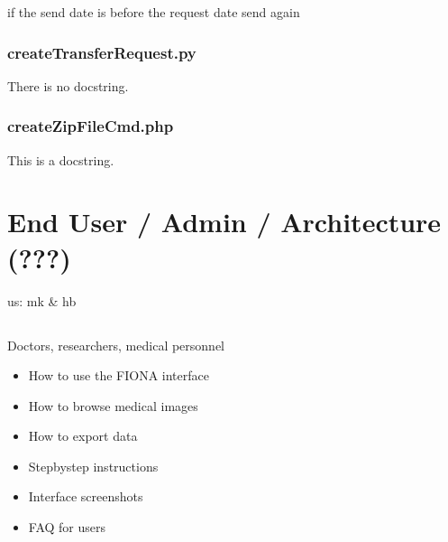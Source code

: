 \documentclass[letterpaper,10pt,english]{sphinxmanual}
\begin{document}
\sphinxAtStartPar
if the send date is before the request date send again

\sphinxstepscope


\subsection{createTransferRequest.py}
\label{\detokenize{Architecture/scripts/createTransferRequest:createtransferrequest-py}}\label{\detokenize{Architecture/scripts/createTransferRequest::doc}}
\sphinxAtStartPar
There is no docstring.

\sphinxstepscope


\subsection{createZipFileCmd.php}
\label{\detokenize{Architecture/scripts/createZipFileCmd:createzipfilecmd-php}}\label{\detokenize{Architecture/scripts/createZipFileCmd::doc}}
\sphinxAtStartPar
This is a docstring.

\sphinxstepscope


\chapter{End User / Admin / Architecture (???)}
\label{\detokenize{Temp/index:end-user-admin-architecture}}\label{\detokenize{Temp/index::doc}}
\sphinxAtStartPar
{} us: mk \& hb

\sphinxstepscope


\section{}
\label{\detokenize{Temp/end-user-options:end-user-options}}\label{\detokenize{Temp/end-user-options::doc}}
\sphinxAtStartPar
{} Doctors, researchers, medical personnel

\sphinxAtStartPar
{}
\begin{itemize}
\item {} 
\sphinxAtStartPar
How to use the FIONA interface

\item {} 
\sphinxAtStartPar
How to browse medical images

\item {} 
\sphinxAtStartPar
How to export data

\item {} 
\sphinxAtStartPar
Step\sphinxhyphen{}by\sphinxhyphen{}step instructions

\item {} 
\sphinxAtStartPar
Interface screenshots

\item {} 
\sphinxAtStartPar
FAQ for users

\end{itemize}
\end{document}
